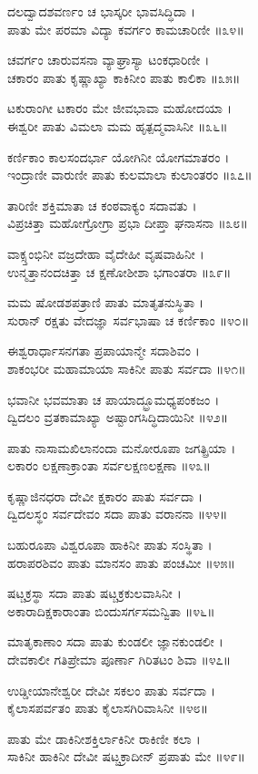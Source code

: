 ದಲದ್ವಾದಶವರ್ಣಂ ಚ ಭಾಸ್ಕರೀ ಭಾವಸಿದ್ಧಿದಾ ।\\
ಪಾತು ಮೇ ಪರಮಾ ವಿದ್ಯಾ ಕವರ್ಗಂ ಕಾಮಚಾರಿಣೀ ॥೩೪॥

ಚವರ್ಗಂ ಚಾರುವಸನಾ ವ್ಯಾಘ್ರಾಸ್ಯಾ ಟಂಕಧಾರಿಣೀ ।\\
ಚಕಾರಂ ಪಾತು ಕೃಷ್ಣಾಖ್ಯಾ ಕಾಕಿನೀಂ ಪಾತು ಕಾಲಿಕಾ ॥೩೫॥

ಟಕುರಾಂಗೀ ಟಕಾರಂ ಮೇ ಜೀವಭಾವಾ ಮಹೋದಯಾ ।\\
ಈಶ್ವರೀ ಪಾತು ವಿಮಲಾ ಮಮ ಹೃತ್ಪದ್ಮವಾಸಿನೀ ॥೩೬॥

ಕರ್ಣಿಕಾಂ ಕಾಲಸಂದರ್ಭಾ ಯೋಗಿನೀ ಯೋಗಮಾತರಂ ।\\
ಇಂದ್ರಾಣೀ ವಾರುಣೀ ಪಾತು ಕುಲಮಾಲಾ ಕುಲಾಂತರಂ ॥೩೭॥

ತಾರಿಣೀ ಶಕ್ತಿಮಾತಾ ಚ ಕಂಠವಾಕ್ಯಂ ಸದಾವತು ।\\
ವಿಪ್ರಚಿತ್ತಾ ಮಹೋಗ್ರೋಗ್ರಾ ಪ್ರಭಾ ದೀಪ್ತಾ ಘನಾಸನಾ ॥೩೮॥

ವಾಕ್ಸ್ತಂಭಿನೀ ವಜ್ರದೇಹಾ ವೈದೇಹೀ ವೃಷವಾಹಿನೀ ।\\
ಉನ್ಮತ್ತಾನಂದಚಿತ್ತಾ ಚ ಕ್ಷಣೋಶೀಶಾ ಭಗಾಂತರಾ ॥೩೯॥

ಮಮ ಷೋಡಶಪತ್ರಾಣಿ ಪಾತು ಮಾತೃತನುಸ್ಥಿತಾ ।\\
ಸುರಾನ್ ರಕ್ಷತು ವೇದಜ್ಞಾ ಸರ್ವಭಾಷಾ ಚ ಕರ್ಣಿಕಾಂ ॥೪೦॥

ಈಶ್ವರಾರ್ಧಾಸನಗತಾ ಪ್ರಪಾಯಾನ್ಮೇ ಸದಾಶಿವಂ ।\\
ಶಾಕಂಭರೀ ಮಹಾಮಾಯಾ ಸಾಕಿನೀ ಪಾತು ಸರ್ವದಾ ॥೪೧॥

ಭವಾನೀ ಭವಮಾತಾ ಚ ಪಾಯಾದ್ಭ್ರೂಮಧ್ಯಪಂಕಜಂ ।\\
ದ್ವಿದಲಂ ವ್ರತಕಾಮಾಖ್ಯಾ ಅಷ್ಟಾಂಗಸಿದ್ಧಿದಾಯಿನೀ ॥೪೨॥

ಪಾತು ನಾಸಾಮಖಿಲಾನಂದಾ ಮನೋರೂಪಾ ಜಗತ್ಪ್ರಿಯಾ ।\\
ಲಕಾರಂ ಲಕ್ಷಣಾಕ್ರಾಂತಾ ಸರ್ವಲಕ್ಷಣಲಕ್ಷಣಾ ॥೪೩॥

ಕೃಷ್ಣಾಜಿನಧರಾ ದೇವೀ ಕ್ಷಕಾರಂ ಪಾತು ಸರ್ವದಾ ।\\
ದ್ವಿದಲಸ್ಥಂ ಸರ್ವದೇವಂ ಸದಾ ಪಾತು ವರಾನನಾ ॥೪೪॥

ಬಹುರೂಪಾ ವಿಶ್ವರೂಪಾ ಹಾಕಿನೀ ಪಾತು ಸಂಸ್ಥಿತಾ ।\\
ಹರಾಪರಶಿವಂ ಪಾತು ಮಾನಸಂ ಪಾತು ಪಂಚಮೀ ॥೪೫॥

ಷಟ್ಚಕ್ರಸ್ಥಾ ಸದಾ ಪಾತು ಷಟ್ಚಕ್ರಕುಲವಾಸಿನೀ ।\\
ಅಕಾರಾದಿಕ್ಷಕಾರಾಂತಾ ಬಿಂದುಸರ್ಗಸಮನ್ವಿತಾ ॥೪೬॥

ಮಾತೃಕಾಣಾಂ ಸದಾ ಪಾತು ಕುಂಡಲೀ ಜ್ಞಾನಕುಂಡಲೀ ।\\
ದೇವಕಾಲೀ ಗತಿಪ್ರೇಮಾ ಪೂರ್ಣಾ ಗಿರಿತಟಂ ಶಿವಾ ॥೪೭॥

ಉಡ್ಡೀಯಾನೇಶ್ವರೀ ದೇವೀ ಸಕಲಂ ಪಾತು ಸರ್ವದಾ ।\\
ಕೈಲಾಸಪರ್ವತಂ ಪಾತು ಕೈಲಾಸಗಿರಿವಾಸಿನೀ ॥೪೮॥

ಪಾತು ಮೇ ಡಾಕಿನೀಶಕ್ತಿರ್ಲಾಕಿನೀ ರಾಕಿಣೀ ಕಲಾ ।\\
ಸಾಕಿನೀ ಹಾಕಿನೀ ದೇವೀ ಷಟ್ಚಕ್ರಾದೀನ್ ಪ್ರಪಾತು ಮೇ ॥೪೯॥

